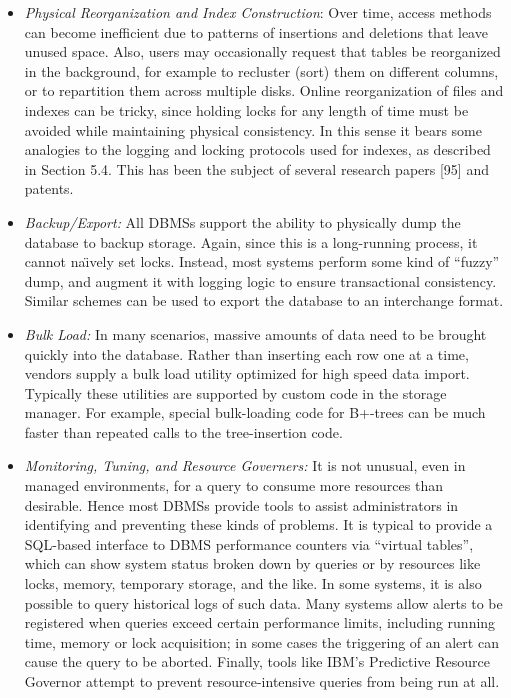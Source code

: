 \documentclass[a4paper,11pt,twoside,openright]{book}
\begin{document}
\begin{itemize}
\item
  \emph{Physical Reorganization and Index Construction}: Over time,
  access methods can become inefficient due to patterns of insertions
  and deletions that leave unused space. Also, users may occasionally
  request that tables be reorganized in the background, for example to
  recluster (sort) them on different columns, or to repartition them
  across multiple disks. Online reorganization of files and indexes can
  be tricky, since holding locks for any length of time must be avoided
  while maintaining physical consistency. In this sense it bears some
  analogies to the logging and locking protocols used for indexes, as
  described in Section 5.4. This has been the subject of several
  research papers {[}95{]} and patents.
\item
  \emph{Backup/Export:} All DBMSs support the ability to physically
  dump the database to backup storage. Again, since this is a
  long-running process, it cannot na{\"\i}vely set locks. Instead, most
  systems perform some kind of ``fuzzy'' dump, and augment it with
  logging logic to ensure transactional consistency. Similar schemes can
  be used to export the database to an interchange format.
\item
  \emph{Bulk Load:} In many scenarios, massive amounts of data need to
  be brought quickly into the database. Rather than inserting each row
  one at a time, vendors supply a bulk load utility optimized for high
  speed data import. Typically these utilities are supported by custom
  code in the storage manager. For example, special bulk-loading code
  for B+-trees can be much faster than repeated calls to the
  tree-insertion code.
\item
  \emph{Monitoring, Tuning, and Resource Governers:} It is not unusual,
  even in managed environments, for a query to consume more resources
  than desirable. Hence most DBMSs provide tools to assist
  administrators in identifying and preventing these kinds of problems.
  It is typical to provide a SQL-based interface to DBMS performance
  counters via ``virtual tables'', which can show system status broken
  down by queries or by resources like locks, memory, temporary storage,
  and the like. In some systems, it is also possible to query historical
  logs of such data. Many systems allow alerts to be registered when
  queries exceed certain performance limits, including running time,
  memory or lock acquisition; in some cases the triggering of an alert
  can cause the query to be aborted. Finally, tools like IBM's
  Predictive Resource Governor attempt to prevent resource-intensive
  queries from being run at all.
\end{itemize}
\end{document}
